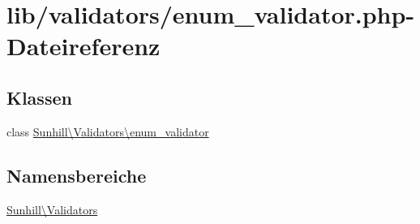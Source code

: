\hypertarget{enum__validator_8php}{}\section{lib/validators/enum\+\_\+validator.php-\/\+Dateireferenz}
\label{enum__validator_8php}
\subsection*{Klassen}
\begin{DoxyCompactItemize}
\item 
class \hyperlink{classSunhill_1_1Validators_1_1enum__validator}{Sunhill\textbackslash{}\+Validators\textbackslash{}enum\+\_\+validator}
\end{DoxyCompactItemize}
\subsection*{Namensbereiche}
\begin{DoxyCompactItemize}
\item 
 \hyperlink{namespaceSunhill_1_1Validators}{Sunhill\textbackslash{}\+Validators}
\end{DoxyCompactItemize}
